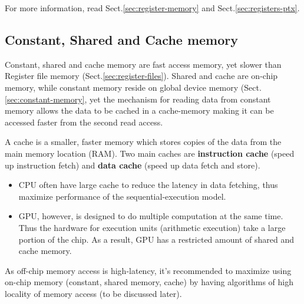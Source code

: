 
For more information, read Sect.\ref{sec:register-memory} and
Sect.\ref{sec:registers-ptx}.


\subsection{Constant, Shared and Cache memory}
\label{sec:const-shar-cache}

Constant, shared and cache memory are fast access memory, yet slower than
Register file memory (Sect.\ref{sec:register-files}). Shared and cache are
on-chip memory, while constant memory reside on global device memory
(Sect.\ref{sec:constant-memory}, yet the mechanism for reading data from
constant memory allows the data to be cached in a cache-memory making it can be
accessed faster from the second read access.
  \begin{framed}
    A cache is a smaller, faster memory which stores copies of the
    data from the main memory location (RAM). Two main caches are
    {\bf instruction cache} (speed up instruction fetch) and
    {\bf data cache} (speed up data fetch and store). 
    \begin{itemize}
    \item CPU often have
      large cache to reduce the latency in data fetching, thus maximize
      performance of the sequential-execution model. 

    \item GPU, however, is designed to do multiple computation at the same
      time. Thus the hardware for execution units (arithmetic execution)
      take a large portion of the chip. As a result, GPU has a restricted
      amount of shared and cache memory. 
    \end{itemize}
    As off-chip memory access is high-latency, it's recommended to
    maximize using on-chip memory (constant, shared memory, cache) by
    having algorithms of high locality of memory access (to be
    discussed later).
  \end{framed}

